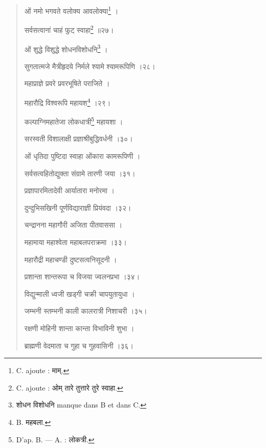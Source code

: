 \documentclass[a4paper, 11pt, oneside, french]{article}
\begin{document}
\begin{quotation}
\bigskip

\texthindi{ओं नमो भगवते वलोक्य आवलोक्या}\footnote{C. ajoute : \texthindi{माम्}.} \texthindi{।}

\texthindi{सर्वसत्वानां चाहं फुट् स्वाहा}\footnote{C. ajoute : \texthindi{ओम् तारे तुत्तारे तुरे स्वाहा}.} \texthindi{॥२७।}

\bigskip

\texthindi{ओं शुद्धे विशुद्धे शोधनविशोधनि}\footnote{\texthindi{शोधन विशोधनि} manque dans B et dans C.} \texthindi{।}

\texthindi{सुगतात्मजे मैत्रीहृदये निर्मले श्यामे श्यामरूपिणि ।२८।}

\bigskip

\texthindi{महाप्राज्ञे प्रवरे प्रवरभूषिते पराजिते ।}

\texthindi{महारौद्रि विश्वरूपि महायश}\footnote{B. \texthindi{महबला.}} \texthindi{।२९।}

\bigskip

\texthindi{कल्पाग्निमहातेजा लोकधात्री}\footnote{D'ap. B. --- A. : \texthindi{लोकत्री}.} \texthindi{महायशा ।}

\texthindi{सरस्वती विशालाक्षी प्रज्ञाश्रीबुद्धिवर्धनी ।३०।}

\bigskip

\texthindi{ओं धृतिदा पुष्टिदा स्वाहा ओंकारा कामरूपिणी ।}

\texthindi{सर्वसत्वहितोद्युक्ता संग्रामे तारणी जया ।३१।}

\bigskip

\texthindi{प्रज्ञापारमितादेवी आर्यातारा मनोरमा ।}

\texthindi{दुन्दुभिसखिनी पूर्णविद्याराज्ञी प्रियंवदा ।३२।}

\bigskip

\texthindi{चन्द्रानना महागौरी अजिता पीतवाससा ।}

\texthindi{महामाया महाश्वेता महाबलपराक्रमा ।३३।}

\bigskip

\texthindi{महारौद्री महाचण्डी दुष्टसत्वनिसूदनी ।}

\texthindi{प्रशान्ता शान्तरूपा च विजया ज्वलनप्रभा ।३४।}

\bigskip

\texthindi{विद्युन्माली ध्वजी खड्गी चक्री चापयुतायुधा ।}

\texthindi{जम्भनी स्तम्भनी काली कालरात्री निशाचरी ।३५।}

\bigskip

\texthindi{रक्षणी मोहिनी शान्ता कान्ता विभाविनी शुभा ।}

\texthindi{ब्राह्मणी वेदमाता च गुहा च गुहवासिनी ।३६।}


\end{quotation}
\end{document}
